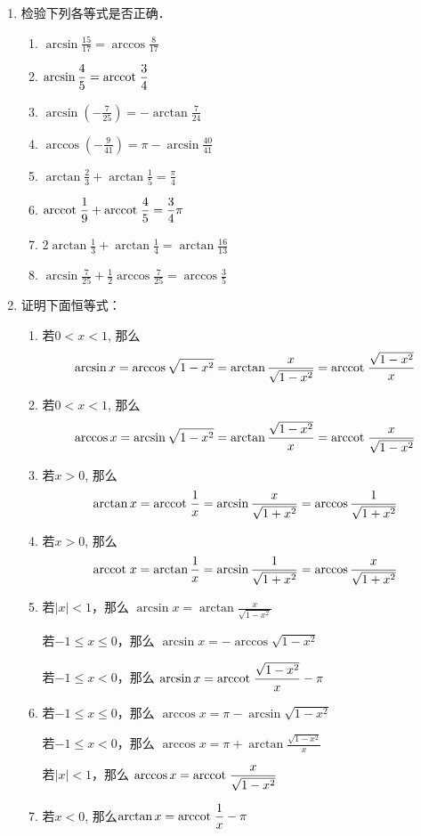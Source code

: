 \begin{enumerate}
\item 检验下列各等式是否正确．
 \begin{enumerate}
\item $\arcsin \frac{15}{17}=\arccos \frac{8}{17}$
\item $\arcsin \dfrac{4}{5}={\rm arccot\; }\dfrac{3}{4}$
\item $\arcsin \left(-\frac{7}{25}\right)=-\arctan \frac{7}{24}$
\item $\arccos \left(-\frac{9}{41}\right)=\pi-\arcsin \frac{40}{41}$
\item  $\arctan \frac{2}{3}+\arctan \frac{1}{5}=\frac{\pi}{4}$
\item ${\rm arccot\; }\dfrac{1}{9}+{\rm arccot\; }\dfrac{4}{5}=\dfrac{3}{4} \pi$
\item  $2 \arctan \frac{1}{3}+\arctan \frac{1}{4}=\arctan \frac{16}{13}$
\item $\arcsin \frac{7}{25}+\frac{1}{2} \arccos \frac{7}{25}=\arccos \frac{3}{5}$
\end{enumerate}   

\item 证明下面恒等式：
\begin{enumerate}
    \item 若$0<x<1$, 那么
\[\arcsin x=\arccos\sqrt{1-x^2}=\arctan\dfrac{x}{\sqrt{1-x^2}}={\rm arccot\; }\dfrac{\sqrt{1-x^2}}{x}\]
    \item 若$0<x<1$, 那么
    \[\arccos x=\arcsin\sqrt{1-x^2}=\arctan\dfrac{\sqrt{1-x^2}}{x}={\rm arccot\; }\dfrac{x}{\sqrt{1-x^2}}\]
    \item 若$x>0$, 那么
  \[\arctan x={\rm arccot\; } \dfrac{1}{x}=\arcsin\dfrac{x}{\sqrt{1+x^2}}=\arccos\dfrac{1}{\sqrt{1+x^2}}\]
  \item 若$x>0$, 那么
  \[{\rm arccot\; } x=\arctan \dfrac{1}{x}=\arcsin\dfrac{1}{\sqrt{1+x^2}}=\arccos\dfrac{x}{\sqrt{1+x^2}}\]
  \item 若$|x|<1$，那么 $\arcsin x=\arctan\frac{x}{\sqrt{1-x^2}}$
  
  若$-1\le x\le 0$，那么 $\arcsin x=-\arccos{\sqrt{1-x^2}}$

  若$-1\le x< 0$，那么 $\arcsin x={\rm arccot\; }\dfrac{\sqrt{1-x^2}}{x}-\pi$

\item 若$-1\le x\le 0$，那么 $\arccos x=\pi-\arcsin{\sqrt{1-x^2}}$

若$-1\le x< 0$，那么 $\arccos x=\pi+\arctan\frac{\sqrt{1-x^2}}{x}$

若$|x|<1$，那么 $\arccos x={\rm arccot\; }\dfrac{x}{\sqrt{1-x^2}}$

\item 若$x<0$, 那么$\arctan x={\rm arccot\; } \dfrac{1}{x}-\pi$


\end{enumerate}
\end{enumerate}
